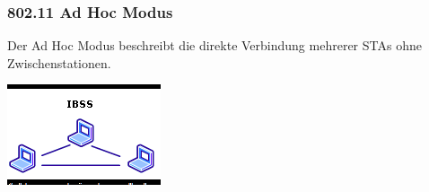 \documentclass[11pt]{article}
\begin{document}
    \subsubsection{802.11 Ad Hoc Modus}
    \begin{minipage}{0.7\textwidth}     %
        Der Ad Hoc Modus beschreibt die direkte Verbindung mehrerer STAs ohne Zwischenstationen.
    \end{minipage}
    \begin{minipage}{0.3\textwidth}     %
        \includegraphics[width=\linewidth]{802-11_AdHoc.png}
    \end{minipage}
\end{document}

